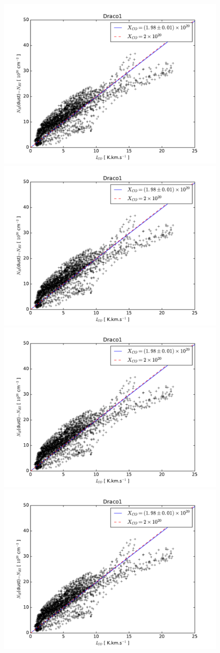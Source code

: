 \documentclass[traditabstract]{aa}
\begin{document}
\begin{figure}[h!]
  \centering
  \includegraphics[page=2,width=0.48\linewidth,trim=30 10 50 25,clip=true]{Figures/dust-CO_comparison.pdf}
  \hspace{3mm}
  \includegraphics[page=4,width=0.48\linewidth,trim=30 10 50 25,clip=true]{Figures/dust-CO_comparison.pdf} \\
  \includegraphics[page=6,width=0.48\linewidth,trim=30 10 50 25,clip=true]{Figures/dust-CO_comparison.pdf}
  \hspace{3mm}
  \includegraphics[page=8,width=0.48\linewidth,trim=30 10 50 25,clip=true]{Figures/dust-CO_comparison.pdf} \\

\end{figure}
\end{document}
